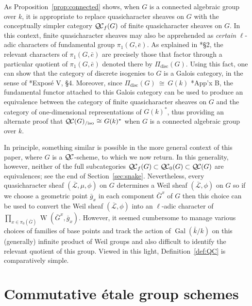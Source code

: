 \documentclass{amsart}
\theoremstyle{plain}
\theoremstyle{definition}
\theoremstyle{remark}
\newcommand{\bFq}{\bar{k}}
\newcommand{\Fq}{k}
\DeclareMathOperator{\Gal}{Gal}
\DeclareMathOperator{\W}{W}
\newcommand{\iso}{{\ \cong\ }}
\newcommand{\gqcs}[1]{{\mathcal{\bar #1}}}
\newcommand{\QC}{{\mathcal{Q\hskip-0.8pt C}}}
\newcommand{\QCb}{{\QC_0}}
\newcommand{\QCf}{{\QC_f}}
\newcommand{\QCiso}[1]{\QC(#1)_{/\text{iso}}}
\newcommand{\bG}{\bar{G}}
\begin{document}
As Proposition~\ref{prop:connected} shows,
when $G$ is a connected algebraic group over $\Fq$,
it is appropriate to replace quasicharacter sheaves on $G$
with the conceptually simpler category $\QCf(G)$ of finite quasicharacter sheaves on $G$.
In this context, finite quasicharacter sheaves may also be apprehended as
\emph{certain} $\ell$-adic characters of fundamental group $\pi_1(G,{\bar e})$.
As explained in \cite{kamgarpour:09a}*{\S2},
the relevant characters of $\pi_1(G,{\bar e})$ are precisely those
that factor through a particular quotient of $\pi_1(G,{\bar e})$
denoted there by $\Pi_\text{disc}(G)$.
Using this fact, one can show that the category of discrete isogenies to $G$ is a Galois category,
in the sense of \cite{grothendieck:SGA1}*{Expos\'e V, \S 4}.
Moreover, since $\Pi_\text{disc}(G) \iso G(\Fq)$ \cite{kamgarpour:09a}*{App'x B},
the fundamental functor attached to this Galois category can be used to produce an equivalence
between the category of finite quasicharacter sheaves on $G$ and
the category of one-dimensional representations of $G(\Fq)^*$, thus
providing an alternate proof that $\QCiso{G} \iso G(\Fq)^*$
when $G$ is a connected algebraic group over $\Fq$.

In principle, something similar is possible in the more general
context of this paper, where $G$ is a $\QC$-scheme, to which we now return.
In this generality, however, neither of the full subcategories $\QCf(G) \subset \QCb(G) \subset \QC(G)$ are equivalences;
see the end of Section~\ref{sec:snake}.
Nevertheless, every quasicharacter sheaf $(\gqcs{L},\mu,\phi)$ on $G$
determines a Weil sheaf $(\gqcs{L},\phi)$ on $G$
so if we choose a geometric point ${\bar g}_x$ in each component $\bG^x$ of $G$
then this choice can be used to convert
the Weil sheaf $(\gqcs{L},\phi)$ into an $\ell$-adic character of $\prod_{x\in \pi_0(\bG)}\W(\bG^x, {\bar g}_x)$.
However, it seemed cumbersome to manage various
choices of families of base points and track the action
of $\Gal(\bFq/\Fq)$ on this (generally) infinite product of
Weil groups and also difficult to identify the relevant quotient of this group.
Viewed in this light, Definition~\ref{def:QC} is comparatively simple.

\section{Commutative \'etale group schemes} \label{sec:etale}
\end{document}
